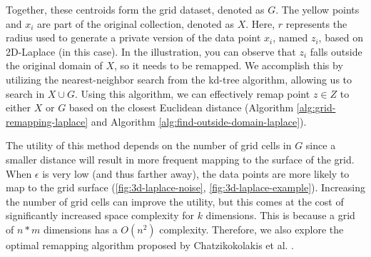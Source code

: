 Together, these centroids form the grid dataset, denoted as $G$.
The yellow points and $x_i$ are part of the original collection, denoted as $X$.
Here, $r$ represents the radius used to generate a private version of the data point $x_i$, named $z_i$, based on 2D-Laplace (in this case).
In the illustration, you can observe that $z_i$ falls outside the original domain of $X$, so it needs to be remapped.
We accomplish this by utilizing the nearest-neighbor search from the kd-tree algorithm, allowing us to search in $X \cup G$.
Using this algorithm, we can effectively remap point $z \in Z$ to either $X$ or $G$ based on the closest Euclidean distance (Algorithm \ref{alg:grid-remapping-laplace} and Algorithm \ref{alg:find-outside-domain-laplace}).

The utility of this method depends on the number of grid cells in $G$ since a smaller distance will result in more frequent mapping to the surface of the grid.
When $\epsilon$ is very low (and thus farther away), the data points are more likely to map to the grid surface (\ref{fig:3d-laplace-noise}, \ref{fig:3d-laplace-example}).
Increasing the number of grid cells can improve the utility, but this comes at the cost of significantly increased space complexity for $k$ dimensions.
This is because a grid of $n*m$ dimensions has a $O(n^2)$ complexity.
Therefore, we also explore the optimal remapping algorithm proposed by Chatzikokolakis et al. \citep{chatzikokolakis_efficient_2017}.



\newpage
